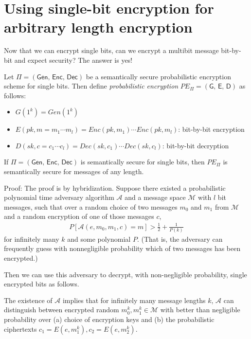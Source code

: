 \documentclass[10pt]{article}
\begin{document}
\section{Using single-bit encryption for arbitrary length encryption}

Now that we can encrypt single bits, can we encrypt a multibit message bit-by-bit and expect security? The answer is yes!

Let $\Pi = (\textsf{Gen, Enc, Dec})$ be a semantically secure probabilistic encryption scheme for single bits. Then define \textit{probabilistic encryption} $PE_\Pi = (\textsf{G, E, D})$ as follows:

\begin{itemize}
  \item $G(1^k) = Gen(1^k)$
  \item $E(pk, m = m_1 \cdots m_l) = Enc(pk, m_1) \cdots Enc(pk, m_l)$: bit-by-bit encryption
  \item $D(sk, c = c_1 \cdots c_l) = Dec(sk, c_1) \cdots Dec(sk, c_l)$: bit-by-bit decryption
\end{itemize}

\begin{theorem}
  If $\Pi = (\textsf{Gen, Enc, Dec})$ is semantically secure for single bits, then $PE_\Pi$ is semantically secure for messages of any length.
\end{theorem}

Proof: The proof is by hybridization. Suppose there existed a probabilistic polynomial time adversary algorithm $\mathcal A$ and a message space $\mathcal M$ with $l$ bit messages, such that over a random choice of two messages $m_0$ and $m_1$ from $\mathcal M$ and a random encryption of one of those messages $c$,
\begin{align}
  P[\mathcal A(e, m_0, m_1, c) = m] > \frac{1}{2} + \frac{1}{P(k)}
\end{align}
for infinitely many $k$ and some polynomial $P.$ (That is, the adversary can frequently guess with nonnegligible probability which of two messages has been encrypted.)

Then we can use this adversary to decrypt, with non-negligible probability, single encrypted bits as follows. 

The existence of $\mathcal A$ implies that for infinitely many message lengths $k$, $\mathcal A$ can distinguish between encrypted random $m_0^k, m_1^k \in \mathcal M$ with better than negligible probability over (a) choice of encryption keys and (b) the probabilistic ciphertexts $c_1 = E(e, m_1^k), c_2 = E(e, m_2^k)$.
\end{document}
